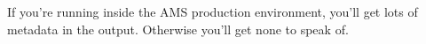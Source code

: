 \documentclass{bproc-l}
\begin{document}
\maketitle

If you're running inside the AMS production environment, you'll get
lots of metadata in the output.  Otherwise you'll get none to speak
of.
\end{document}
